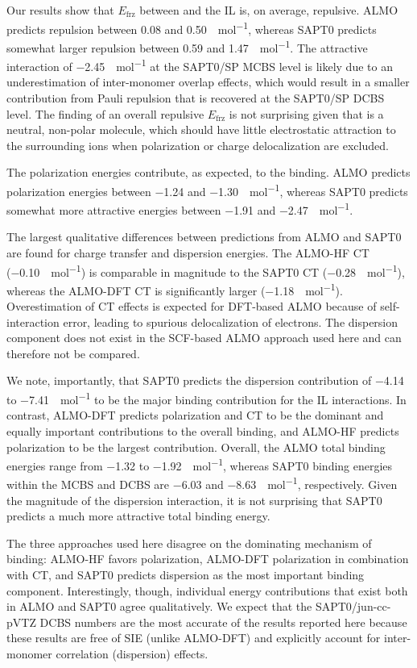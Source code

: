 \documentclass[%
  class = book,%
  crop = false,%
  float = true,%
  multi = true,%
  preview = false,%
]{standalone}
\newcommand{\cotil}{\ce{CO2}\textendash{}IL\xspace}%
\begin{document}
Our results show that \(E_{\text{frz}}\) between  and the IL is, on average, repulsive. ALMO predicts repulsion between \num{+0.08} and \SI{0.50}{\kcal\per\mole}, whereas SAPT0 predicts somewhat larger repulsion between \num{0.59} and \SI{1.47}{\kcal\per\mole}. The attractive interaction of \SI{-2.45}{\kcal\per\mole} at the SAPT0/SP MCBS level is likely due to an underestimation of inter-monomer overlap effects, which would result in a smaller contribution from Pauli repulsion that is recovered at the SAPT0/SP DCBS level. The finding of an overall repulsive \(E_{\text{frz}}\) is not surprising given that  is a neutral, non-polar molecule, which should have little electrostatic attraction to the surrounding ions when polarization or charge delocalization are excluded.

The polarization energies contribute, as expected, to the binding. ALMO predicts polarization energies between \num{-1.24} and \SI{-1.30}{\kcal\per\mole}, whereas SAPT0 predicts somewhat more attractive energies between \num{-1.91} and \SI{-2.47}{\kcal\per\mole}.

The largest qualitative differences between predictions from ALMO and SAPT0 are found for charge transfer and dispersion energies. The ALMO-HF CT (\SI{-0.10}{\kcal\per\mole}) is comparable in magnitude to the SAPT0 CT (\SI{-0.28}{\kcal\per\mole}), whereas the ALMO-DFT CT is significantly larger (\SI{-1.18}{\kcal\per\mole}). Overestimation of CT effects is expected for DFT-based ALMO because of self-interaction error, leading to spurious delocalization of electrons. The dispersion component does not exist in the SCF-based ALMO approach used here and can therefore not be compared.

We note, importantly, that SAPT0 predicts the dispersion contribution of \num{-4.14} to \SI{-7.41}{\kcal\per\mole} to be the major binding contribution for the \cotil interactions. In contrast, ALMO-DFT predicts polarization and CT to be the dominant and equally important contributions to the overall binding, and ALMO-HF predicts polarization to be the largest contribution. Overall, the ALMO total binding energies range from \num{-1.32} to \SI{-1.92}{\kcal\per\mole}, whereas SAPT0 binding energies within the MCBS and DCBS are \num{-6.03} and \SI{-8.63}{\kcal\per\mole}, respectively. Given the magnitude of the dispersion interaction, it is not surprising that SAPT0 predicts a much more attractive total binding energy.

The three approaches used here disagree on the dominating mechanism of binding: ALMO-HF favors polarization, ALMO-DFT polarization in combination with CT, and SAPT0 predicts dispersion as the most important binding component. Interestingly, though, individual energy contributions that exist both in ALMO and SAPT0 agree qualitatively. We expect that the SAPT0/jun-cc-pVTZ DCBS numbers are the most accurate of the results reported here because these results are free of SIE (unlike ALMO-DFT) and explicitly account for inter-monomer correlation (dispersion) effects.
\end{document}
